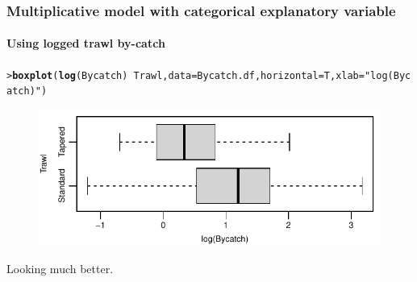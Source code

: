 \documentclass{beamer}\usepackage[]{graphicx}\usepackage[]{xcolor}
\makeatletter
\newcommand{\hlstr}[1]{\textcolor[rgb]{0.192,0.494,0.8}{#1}}%
\newcommand{\hlopt}[1]{\textcolor[rgb]{0,0,0}{#1}}%
\newcommand{\hlstd}[1]{\textcolor[rgb]{0.345,0.345,0.345}{#1}}%
\newcommand{\hlkwc}[1]{\textcolor[rgb]{0.333,0.667,0.333}{#1}}%
\newcommand{\hlkwd}[1]{\textcolor[rgb]{0.737,0.353,0.396}{\textbf{#1}}}%
\newenvironment{kframe}{%
 \def\at@end@of@kframe{}%
 \ifinner\ifhmode%
  \def\at@end@of@kframe{\end{minipage}}%
  \begin{minipage}{\columnwidth}%
 \fi\fi%
 \def\FrameCommand##1{\hskip\@totalleftmargin \hskip-\fboxsep
 \colorbox{shadecolor}{##1}\hskip-\fboxsep
     \hskip-\linewidth \hskip-\@totalleftmargin \hskip\columnwidth}%
 \MakeFramed {\advance\hsize-\width
   \@totalleftmargin\z@ \linewidth\hsize
   \@setminipage}}%
 {\par\unskip\endMakeFramed%
 \at@end@of@kframe}
\newenvironment{knitrout}{}{} %
\makeatother
\begin{document}
\begin{frame}[fragile]
\frametitle{Multiplicative model with categorical explanatory variable}
\framesubtitle{Using logged trawl by-catch}
\begin{knitrout}\scriptsize
{}\color{fgcolor}\begin{kframe}
\begin{alltt}
\hlstd{> }\hlkwd{boxplot}\hlstd{(}\hlkwd{log}\hlstd{(Bycatch)}\hlopt{~}\hlstd{Trawl,}\hlkwc{data}\hlstd{=Bycatch.df,}\hlkwc{horizontal}\hlstd{=T,}\hlkwc{xlab}\hlstd{=}\hlstr{"log(Bycatch)"}\hlstd{)}
\end{alltt}
\end{kframe}
\end{knitrout}



\begin{figure}
  \centering
  \includegraphics{figure/RC-H06-055}
\end{figure}

Looking much better. 
\end{frame}
\end{document}
